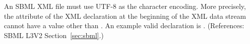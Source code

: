 An SBML XML file must use UTF-8 as the character encoding.  More
precisely, the  attribute of the XML declaration
at the beginning of the XML data stream cannot have a value other
than .  An example valid declaration is .  (References: SBML L3V2
Section~\ref{sec:sbml}.) 
